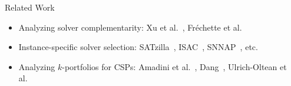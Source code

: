 \documentclass[en]{sdqbeamer}
\begin{document}
\begin{frame}[t]{Related Work}
	\begin{itemize}
		\item Analyzing solver complementarity: Xu et al.~\cite{Xu:2012:EvalContribVBS}, Fr{\'e}chette et al.~\cite{frechette2016using}
		\pause
		\vspace{\baselineskip}
		\item Instance-specific solver selection: SATzilla~\cite{xu2008satzilla, xu2012satzilla2012}, ISAC~\cite{Kadioglu:2010:ISAC}, SNNAP~\cite{Collautti:2013:SNNAP}, etc.
		\pause
		\vspace{\baselineskip}
		\item Analyzing $k$-portfolios for CSPs: Amadini et al.~\cite{amadini2014empirical, amadini2016extensive}, Dang~\cite{dang2022portfolio}, Ulrich-Oltean et al.~\cite{ulrich2022selecting}

\end{itemize}
\end{frame}
\end{document}
